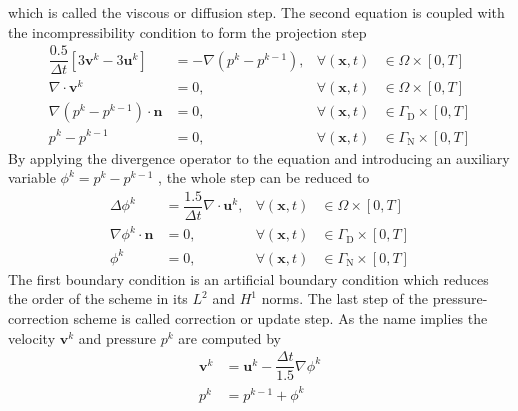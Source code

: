 \documentclass[]{scrartcl}
\begin{document}
which is called the viscous or diffusion step. The second equation is coupled with the incompressibility condition to form the projection step
\begin{equation*}
\begin{aligned}
		\dfrac{0.5}{\Delta t} \left[3\mathbf{v}^{k} - 3\mathbf{u}^{k} \right] &= -\nabla (p^{k} - p^{k-1}), &\forall (\mathbf{x}, t) &\in \Omega \times \left[0, T \right] \\
		\nabla \cdot \mathbf{v}^{k} &= 0, &\forall (\mathbf{x}, t) &\in \Omega \times \left[0, T \right] \\
	\nabla(p^{k} - p^{k-1}) \cdot \mathbf{n} &= 0, &\forall (\mathbf{x}, t) &\in \Gamma_\textrm{D} \times \left[0, T \right] \\
		p^{k} - p^{k-1} &=0, &\forall\left(\mathbf{x}, t\right) &\in \Gamma_\textrm{N} \times \left[0, T \right]
\end{aligned}	
\end{equation*}
By applying the divergence operator to the equation and introducing an auxiliary variable $\phi^{k} = p^{k} - p^{k-1}$ , the whole step can be reduced to
\begin{equation*}
\begin{aligned}
	\Delta \phi^{k} &= \dfrac{1.5}{\Delta t} \nabla \cdot \mathbf{u}^{k},  &\forall (\mathbf{x}, t) &\in \Omega \times \left[0, T \right] \\
	\nabla \phi^{k} \cdot \mathbf{n} &= 0, &\forall (\mathbf{x}, t) &\in \Gamma_\textrm{D} \times \left[0, T \right] \\
	\phi^{k} &= 0, &\forall\left(\mathbf{x}, t\right) &\in \Gamma_\textrm{N} \times \left[0, T \right]
\end{aligned}
\end{equation*}
The first boundary condition is an artificial boundary condition which reduces the order of the scheme in its $L^2$ and $H^1$ norms. The last step of the pressure-correction scheme is called correction or update step. As the name implies the velocity $\mathbf{v}^{k}$ and pressure $p^{k}$ are computed by
\begin{equation*}
\begin{aligned}
	\mathbf{v}^{k} &= \mathbf{u}^{k} - \dfrac{\Delta t}{1.5} \nabla \phi^{k} \\
	p^{k} &= p^{k-1} + \phi^{k}
\end{aligned}
\end{equation*}
\end{document}
